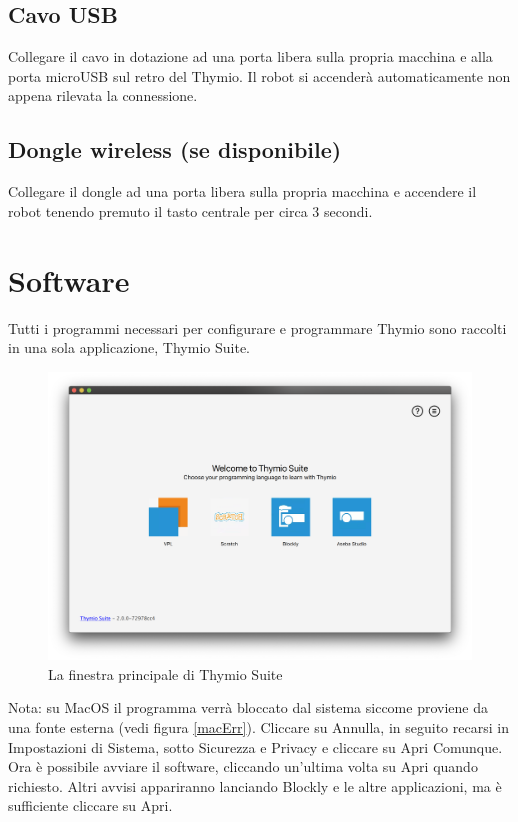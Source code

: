 \documentclass[12pt]{article}
\begin{document}
	\subsection{Cavo USB}
	
		Collegare il cavo in dotazione ad una porta libera sulla propria macchina e alla porta microUSB sul retro del Thymio. Il robot si accenderà automaticamente non appena rilevata la connessione.
		
	\subsection{Dongle wireless (se disponibile)}
	
		Collegare il dongle ad una porta libera sulla propria macchina e accendere il robot tenendo premuto il tasto centrale per circa 3 secondi.
	

\section{Software}

	Tutti i programmi necessari per configurare e programmare Thymio sono raccolti in una sola applicazione, Thymio Suite.
	
	\begin{figure}[H]
		\includegraphics[width=\textwidth]{img/thymioSuite.png}
		\caption{La finestra principale di Thymio Suite}
		\label{aseba1}
	\end{figure}
	
	Nota: su MacOS il programma verrà bloccato dal sistema siccome proviene da una fonte esterna (vedi figura \ref{macErr}). Cliccare su Annulla, in seguito recarsi in Impostazioni di Sistema, sotto Sicurezza e Privacy e cliccare su Apri Comunque. Ora è possibile avviare il software, cliccando un'ultima volta su Apri quando richiesto. Altri avvisi appariranno lanciando Blockly e le altre applicazioni, ma è sufficiente cliccare su Apri.
		
\end{document}
